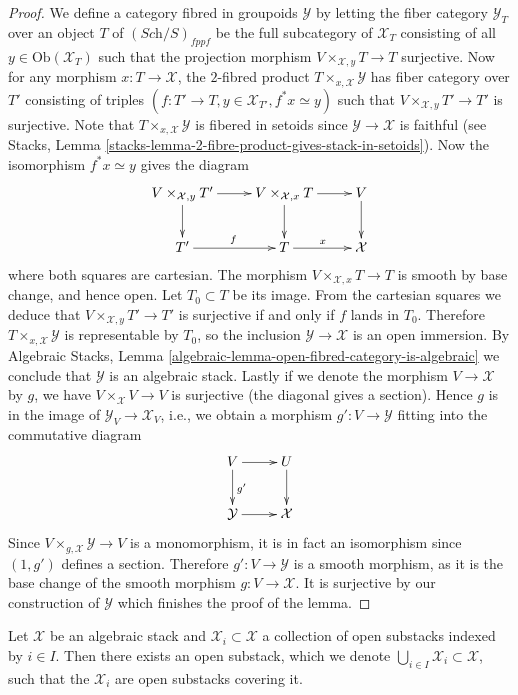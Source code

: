 \begin{proof}
We define a category fibred in groupoids $\mathcal Y$ by letting the fiber
category $\mathcal{Y}_T$ over an object $T$ of $(\textit{Sch}/S)_{fppf}$ be 
the full subcategory of $\mathcal{X}_T$ consisting of all
$y \in \text{Ob}(\mathcal{X}_T)$ such that the projection morphism
$V \times_{\mathcal X, y} T \to T$ surjective. Now for any morphism
$x : T \to \mathcal X$, the $2$-fibred product
$T \times_{x, \mathcal X} \mathcal Y$ has fiber category over $T'$ consisting
of triples $(f : T' \to T, y \in \mathcal{X}_{T'}, f^*x \simeq y)$ such that
$V \times_{\mathcal X, y} T' \to T'$ is surjective.
Note that $T \times_{x, \mathcal X} \mathcal Y$ is fibered in setoids since
$\mathcal Y \to \mathcal X$ is faithful (see
Stacks, Lemma \ref{stacks-lemma-2-fibre-product-gives-stack-in-setoids}).
Now the isomorphism $f^*x \simeq y$ gives the diagram
$$
\xymatrix{
V \times_{\mathcal X, y} T' \ar[d] \ar[r] &
V \times_{\mathcal X,x} T \ar[r] \ar[d] &
V \ar[d] \\
T' \ar[r]^f &
T \ar[r]^x &
\mathcal X
}
$$
where both squares are cartesian. The morphism
$V \times_{\mathcal X, x} T \to T$ is smooth by base change, and hence open.
Let $T_0 \subset T$ be its image. From the cartesian squares we deduce that 
$V \times_{\mathcal X,y} T' \to T'$ is surjective if and only if $f$ lands
in $T_0$.  Therefore $T \times_{x, \mathcal X} \mathcal Y$ is representable by
$T_0$, so the inclusion $\mathcal Y \to \mathcal X$ is an open immersion.
By
Algebraic Stacks, Lemma \ref{algebraic-lemma-open-fibred-category-is-algebraic}
we conclude that $\mathcal{Y}$ is an algebraic stack.
Lastly if we denote the morphism $V \to \mathcal X$ by $g$, we have
$V \times_{\mathcal X} V \to V$ is surjective (the diagonal gives a
section). Hence $g$ is in the image of $\mathcal{Y}_V \to \mathcal{X}_V$, i.e.,
we obtain a morphism $g' : V \to \mathcal{Y}$ fitting into the commutative
diagram
$$
\xymatrix{
V \ar[r] \ar[d]^{g'} & U \ar[d] \\
\mathcal{Y} \ar[r] & \mathcal{X}
}
$$
Since $V \times_{g, \mathcal X} \mathcal Y \to V$ is a
monomorphism, it is in fact an isomorphism since $(1, g')$ defines a section.
Therefore $g' : V \to \mathcal Y$ is a smooth morphism, as it is the
base change of the smooth morphism $g : V \to \mathcal{X}$.
It is surjective by our construction of $\mathcal{Y}$ which finishes
the proof of the lemma.
\end{proof}

\begin{lemma} 
\label{lemma-union-open-substacks} 
Let $\mathcal X$ be an algebraic stack and $\mathcal{X}_i \subset \mathcal X$
a collection of open substacks indexed by $i \in I$. Then there exists an
open substack, which we denote
$\bigcup_{i\in I} \mathcal{X}_i \subset \mathcal X$, such that 
the $\mathcal{X}_i$ are open substacks covering it.
\end{lemma}


